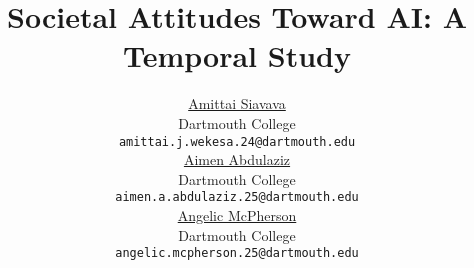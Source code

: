 
\usepackage{arxiv}
\usepackage[utf8]{inputenc} %
\usepackage[T1]{fontenc}    %
\usepackage{hyperref}       %
\usepackage{url}            %
\usepackage{booktabs}       %
\usepackage{amsfonts}       %
\usepackage{nicefrac}       %
\usepackage{microtype}      %
\usepackage{cleveref}       %
\usepackage{lipsum}         %
\usepackage{graphicx}
\usepackage{doi}
\usepackage[backend=bibtex,style=numeric]{biblatex}
\usepackage{pgfplots}
\pgfplotsset{compat=1.18}

\usepackage{subcaption}

\usepackage{float}

\usepackage{enumitem}

\newenvironment{enumalph}{
  \begin{enumerate}[label=(\alph*)]
}{\end{enumerate}}

\newenvironment{enumroman}{
  \begin{enumerate}[label=(\roman*)]
}{\end{enumerate}}

\newenvironment{enumarabic}{
  \begin{enumerate}[label=\textbf{\arabic*.}]
}{\end{enumerate}}

\newenvironment{enumarabic*}{
  \begin{enumerate}[label*=\textbf{\arabic*.}]
}{\end{enumerate}}


\title{Societal Attitudes Toward AI: A Temporal Study}
\author{
	\href{https://amittai.studio}{Amittai Siavava} \\
		Dartmouth College \\
		\texttt{amittai.j.wekesa.24@dartmouth.edu} \\
	\And
	\href{https://github.com/aimenabdulaziz}{Aimen Abdulaziz} \\
		Dartmouth College \\
		\texttt{aimen.a.abdulaziz.25@dartmouth.edu} \\
	\And
	\href{https://github.com/AngelicMcPherson}{Angelic McPherson} \\
		Dartmouth College \\
		\texttt{angelic.mcpherson.25@dartmouth.edu}
}

